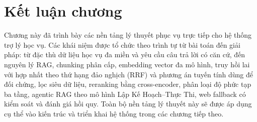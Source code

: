 \documentclass[../DoAn.tex]{subfiles}
\begin{document}
\section{Kết luận chương}

Chương này đã trình bày các nền tảng lý thuyết phục vụ trực tiếp cho hệ thống
trợ lý học vụ. Các khái niệm được tổ chức theo trình tự từ bài toán đến giải
pháp: từ đặc thù dữ liệu học vụ đa miền và yêu cầu câu trả lời có căn cứ, đến
nguyên lý RAG, chunking phân cấp, embedding vector đa mô hình, truy hồi lai với
hợp nhất theo thứ hạng đảo nghịch (RRF) và phương án tuyến tính dùng để đối
chứng, lọc siêu dữ liệu, reranking bằng cross-encoder, phân loại độ phức tạp ba
tầng, agentic RAG theo mô hình
Lập Kế Hoạch--Thực Thi, web fallback có kiểm soát và đánh giá hồi quy. Toàn
bộ nền tảng lý thuyết này sẽ được áp dụng cụ thể vào kiến trúc và triển khai
hệ thống trong các chương tiếp theo.
\end{document}
